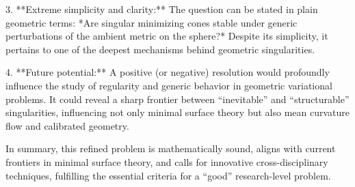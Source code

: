 3. **Extreme simplicity and clarity:**  
   The question can be stated in plain geometric terms: *Are singular minimizing cones stable under generic perturbations of the ambient metric on the sphere?* Despite its simplicity, it pertains to one of the deepest mechanisms behind geometric singularities.

4. **Future potential:**  
   A positive (or negative) resolution would profoundly influence the study of regularity and generic behavior in geometric variational problems. It could reveal a sharp frontier between “inevitable” and “structurable” singularities, influencing not only minimal surface theory but also mean curvature flow and calibrated geometry.

In summary, this refined problem is mathematically sound, aligns with current frontiers in minimal surface theory, and calls for innovative cross-disciplinary techniques, fulfilling the essential criteria for a “good” research-level problem.